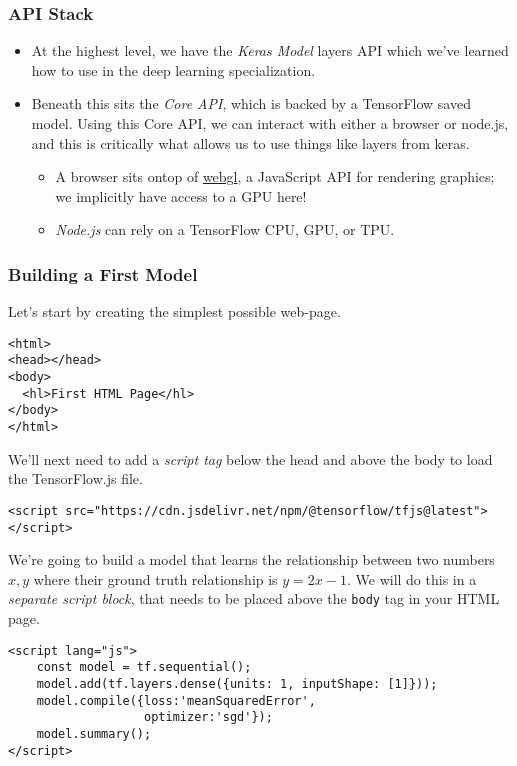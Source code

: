 \documentclass[12pt]{article}
\begin{document}
\subsubsection{API Stack}
\begin{itemize}
\item At the highest level, we have the \emph{Keras Model} layers API which   we've learned how to use in the deep learning specialization.
\item Beneath this sits the \emph{Core API}, which is backed by a TensorFlow saved model. Using this Core API, we can interact with either a browser or node.js, and this is critically what allows us to use things like layers from keras.
\begin{itemize}
\item A browser sits ontop of \href{https://en.wikipedia.org/wiki/WebGL}{webgl},   a JavaScript API for rendering graphics; we implicitly have access to a GPU here!
\item \emph{Node.js} can rely on a TensorFlow CPU, GPU, or TPU.
\end{itemize}
\end{itemize}

\subsubsection{Building a First Model} Let's start by creating the simplest possible web-page.
\begin{verbatim}
<html>
<head></head>
<body>
  <hl>First HTML Page</hl>
</body>
</html>
\end{verbatim}

We'll next need to add a \emph{script tag} below the head and above the body to load the TensorFlow.js file.

\begin{verbatim}
<script src="https://cdn.jsdelivr.net/npm/@tensorflow/tfjs@latest"></script>
\end{verbatim}

We're going to build a model that learns the relationship between two numbers $x,y$ where their ground truth relationship is $y = 2x - 1$. We will do this in a \emph{separate script block}, that needs to be placed above the \texttt{body} tag in your HTML page.

\begin{verbatim}
<script lang="js">
    const model = tf.sequential();
    model.add(tf.layers.dense({units: 1, inputShape: [1]}));
    model.compile({loss:'meanSquaredError',
                   optimizer:'sgd'});
    model.summary();
</script>
\end{verbatim}
\end{document}
